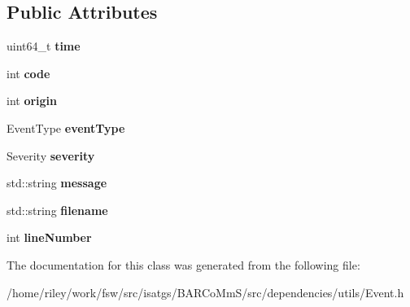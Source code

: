 \subsection*{Public Attributes}
\begin{DoxyCompactItemize}
\item 
uint64\+\_\+t {\bfseries time}\hypertarget{classisat__utils_1_1_event_a39f6a1b32316bb9eaf1642b81a1d0ce1}{}\label{classisat__utils_1_1_event_a39f6a1b32316bb9eaf1642b81a1d0ce1}

\item 
int {\bfseries code}\hypertarget{classisat__utils_1_1_event_abd242b47eb95f470cefa2fe900a183a1}{}\label{classisat__utils_1_1_event_abd242b47eb95f470cefa2fe900a183a1}

\item 
int {\bfseries origin}\hypertarget{classisat__utils_1_1_event_aae97a885f62a407623a388ca285a1217}{}\label{classisat__utils_1_1_event_aae97a885f62a407623a388ca285a1217}

\item 
Event\+Type {\bfseries event\+Type}\hypertarget{classisat__utils_1_1_event_a98552290e5cce1e3494555523f2293a7}{}\label{classisat__utils_1_1_event_a98552290e5cce1e3494555523f2293a7}

\item 
Severity {\bfseries severity}\hypertarget{classisat__utils_1_1_event_ad60873c2cbc73707c88cd36b6a6760ee}{}\label{classisat__utils_1_1_event_ad60873c2cbc73707c88cd36b6a6760ee}

\item 
std\+::string {\bfseries message}\hypertarget{classisat__utils_1_1_event_a62f5fb5019482bfd033f6aee597ba90a}{}\label{classisat__utils_1_1_event_a62f5fb5019482bfd033f6aee597ba90a}

\item 
std\+::string {\bfseries filename}\hypertarget{classisat__utils_1_1_event_af65ed4fd7e0b9b4cae06fb7fc634a668}{}\label{classisat__utils_1_1_event_af65ed4fd7e0b9b4cae06fb7fc634a668}

\item 
int {\bfseries line\+Number}\hypertarget{classisat__utils_1_1_event_a1516f5da2cf02000dff29fa494b6bbec}{}\label{classisat__utils_1_1_event_a1516f5da2cf02000dff29fa494b6bbec}

\end{DoxyCompactItemize}


The documentation for this class was generated from the following file\+:\begin{DoxyCompactItemize}
\item 
/home/riley/work/fsw/src/isatgs/\+B\+A\+R\+Co\+Mm\+S/src/dependencies/utils/Event.\+h\end{DoxyCompactItemize}
